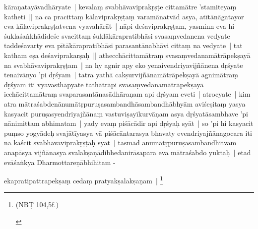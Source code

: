 \documentclass[article,12pt,a4paper]{memoir}
\begin{document}
kāraṇatayāvadhāryate | kevalaṃ svabhāvaviprakṛṣṭe cittamātre 'stamiteyaṃ katheti || \label{thakur75-146.7} na ca pracittaṃ kālaviprakṛṣṭaṃ varamānatvād asya, atītānāgatayor eva kālaviprakṛṣṭatvena vyavahārāt | \label{thakur75-146.9} nāpi deśaviprakṛṣṭam, yasminn eva hi śuklaśaṅkhādideśe svacittaṃ śuklākārapratibhāsi svasaṃvedanena vedyate taddeśavarty eva pītākārapratibhāsi parasantānabhāvi cittaṃ na vedyate | tat katham eṣa deśaviprakarṣaḥ || \label{thakur75-146.12} athecchācittamātraṃ svasaṃvedanamātrāpekṣayā na svabhāvaviprakṛṣṭam | na hy agnir apy eko yenaivendriyavijñānena dṛśyate tenaivānyo 'pi dṛśyam | tatra yathā cakṣurvijñānamātrāpekṣayā agnimātraṃ dṛśyam iti vyavasthāpyate tathātrāpi svasaṃvedanamātrāpekṣayā icchācittamātraṃ svaparasantānasādhāraṇam api dṛśyam eveti | \label{thakur75-146.16} atrocyate | kim atra mātraśabdenānumātṛpuruṣasambandhāsambandhābhyām aviśeṣitaṃ yasya kasyacit puruṣasyendriyajñānaṃ vastuviṣayīkurvāṇam asya dṛśyatāsambhave 'pi nānimittam abhimatam | yady evaṃ piśācādir api dṛśyaḥ syāt | so 'pi hi kasyacit puṃso yogyādeḥ svajātīyasya vā piśācāntarasya bhavaty evendriyajñānagocara iti na kaścit svabhāvaviprakṛṣṭaḥ syāt | tasmād anumātṛpuruṣasambandhitvam anapāsya vijñānasya svalakṣaṇādibhedanirāsapara eva mātraśabdo yuktaḥ | etad evāśaṅkya Dharmottareṇābhihitam -
	\pend
      

	  \pstart ekapratipattrapekṣaṃ cedaṃ pratyakṣalakṣaṇam | \footnote{\begin{english}(NBṬ 104,5f.)\end{english}}
	\pend
      
\end{document}
